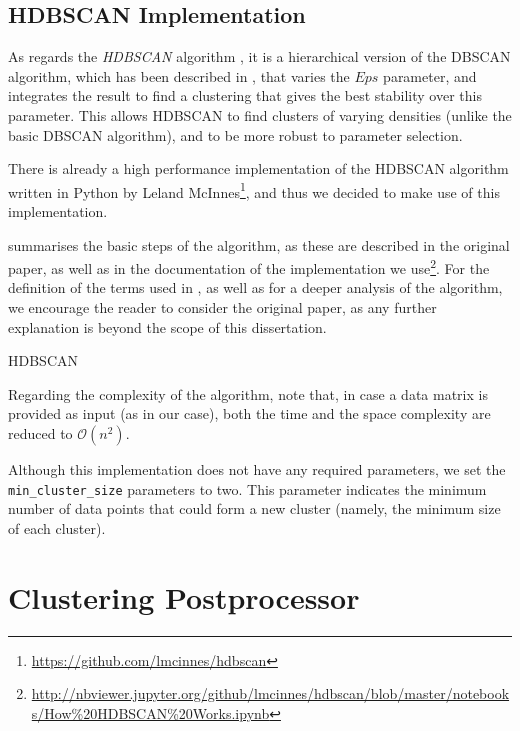 \subsection{HDBSCAN Implementation}
\label{subsec:hdbscan-implementation}

As regards the \textit{HDBSCAN} algorithm \cite{Campello:2013}, it is a hierarchical version of the DBSCAN algorithm, which has been described in , that varies the $Eps$ parameter, and integrates the result to find a clustering that gives the best stability over this parameter. This allows HDBSCAN to find clusters of varying densities (unlike the basic DBSCAN algorithm), and to be more robust to parameter selection.

There is already a high performance implementation of the HDBSCAN algorithm written in Python by Leland McInnes\footnote{\url{https://github.com/lmcinnes/hdbscan}}, and thus we decided to make use of this implementation.

 summarises the basic steps of the algorithm, as these are described in the original paper, as well as in the documentation of the implementation we use\footnote{\url{http://nbviewer.jupyter.org/github/lmcinnes/hdbscan/blob/master/notebooks/How\%20HDBSCAN\%20Works.ipynb}}. For the definition of the terms used in , as well as for a deeper analysis of the algorithm, we encourage the reader to consider the original paper, as any further explanation is beyond the scope of this dissertation.

\begin{algorithm}
\small
\caption[HDBSCAN]{HDBSCAN}
\label{algorithms:hdbscan}

\end{algorithm}

Regarding the complexity of the algorithm,  note that, in case a data matrix is provided as input (as in our case), both the time and the space complexity are reduced to $\mathcal{O}(n^2)$.

Although this implementation does not have any required parameters, we set the \texttt{min\_cluster\_size} parameters to two. This parameter indicates the minimum number of data points that could form a new cluster (namely, the minimum size of each cluster).


\section{Clustering Postprocessor}
\label{sec:clustering-postprocessor}

